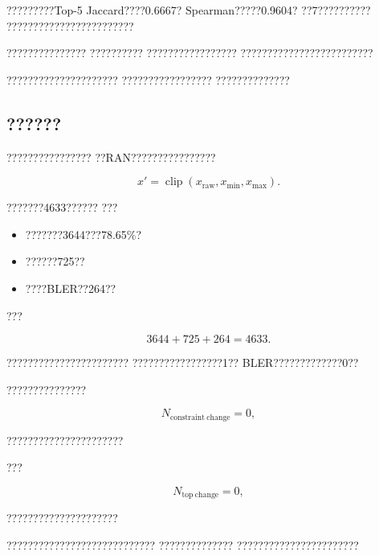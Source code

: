 ?????????Top-5 Jaccard????0.6667?
Spearman?????0.9604?
??7??????????
????????????????????????

???????????????
??????????
?????????????????
?????????????????????????

?????????????????????
?????????????????
??????????????


\subsection*{??????}

????????????????
??RAN????????????????

\begin{equation}
x'
=
\operatorname{clip}
\left(
x_{\mathrm{raw}},
x_{\min},
x_{\max}
\right).
\label{eq:model_clipping_reduced}
\end{equation}

???????4633??????
???

\begin{itemize}
    \item ???????3644???78.65\%?
    \item ??????725??
    \item ????BLER??264??
\end{itemize}

???

\begin{equation}
3644+725+264=4633.
\label{eq:clipping_count_reduced}
\end{equation}

???????????????????????
?????????????????1??
BLER?????????????0??

???????????????

\begin{equation}
N_{\mathrm{constraint\ change}}=0,
\label{eq:clipping_constraint_change_reduced}
\end{equation}

??????????????????????

???

\begin{equation}
N_{\mathrm{top\ change}}=0,
\label{eq:clipping_top_change_reduced}
\end{equation}

?????????????????????

????????????????????????????
??????????????
???????????????????????
